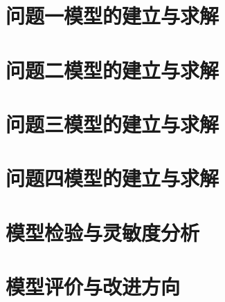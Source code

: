 \section{问题一模型的建立与求解}
\label{sec:p1}




\let\savedSectionFloatBarrier\FloatBarrier
\let\FloatBarrier\relax
\section{问题二模型的建立与求解}
\let\FloatBarrier\savedSectionFloatBarrier
\label{sec:p2}




\section{问题三模型的建立与求解}
\label{sec:p3}




\section{问题四模型的建立与求解}
\label{sec:p4}




\section{模型检验与灵敏度分析}
\label{sec:verification}


\let\savedSectionFloatBarrier\FloatBarrier
\let\FloatBarrier\relax
\section{模型评价与改进方向}
\let\FloatBarrier\savedSectionFloatBarrier
\label{sec:evaluation}

